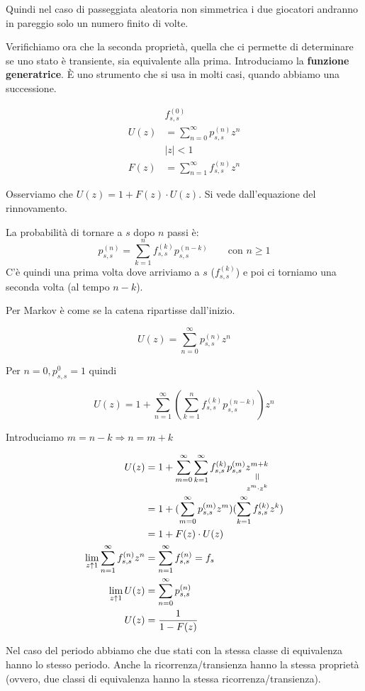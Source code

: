 \documentclass[a4paper,12pt]{book}
\newcommand{\verteq}{\rotatebox{90}{$\,=$}}
\newcommand{\equalto}[2]{\underset{\scriptstyle\overset{\mkern4mu\verteq}{#2}}{#1}}
\begin{document}
Quindi nel caso di passeggiata aleatoria non simmetrica i due giocatori andranno in pareggio solo un numero finito di volte. 

Verifichiamo ora che la seconda proprietà, quella che ci permette di determinare se uno stato è transiente, sia equivalente alla prima. Introduciamo la \textbf{funzione generatrice}. È uno strumento che si usa in molti casi, quando abbiamo una successione. 

\begin{align*}
	& f_{s,s}^{(0)} \\
	U(z) & = \sum_{n=0}^{\infty} p_{s,s}^{(n)} z^n \\
	& |z| < 1 \\
	F(z) & = \sum_{n=1}^{\infty} f_{s,s}^{(n)} z^n
\end{align*}

Osserviamo che $ U(z) = 1 + F(z)\cdot U(z) $. Si vede dall'equazione del rinnovamento. 

La probabilità di tornare a $ s $ dopo $ n $ passi è:
$$ p_{s,s}^{(n)} = \sum_{k=1}^{n} f_{s,s}^{(k)} p_{s,s}^{(n-k)} \qquad \text{con } n \ge 1 $$
C'è quindi una prima volta dove arriviamo a $ s $ ($ f_{s,s}^{(k)} $) e poi ci torniamo una seconda volta (al tempo $ n-k $). 

Per Markov è come se la catena ripartisse dall'inizio. 


 $$ U(z) = \sum_{n=0}^{\infty} p_{s,s}^{(n)} z^n $$
 
Per $ n = 0, p_{s,s}^0 = 1 $ quindi 

$$ U(z)	= 1 + \sum_{n=1}^{\infty} (\sum_{k=1}^{n} f_{s,s}^{(k)} p_{s,s}^{(n-k)}) z^n $$

Introduciamo $ m = n-k \Rightarrow n=m+k $

\begin{align*}
	U(z) & = 1 + \sum_{m=0}^{\infty} \sum_{k=1}^{\infty} f_{s,s}^{(k)} p_{s,s}^{(m)} \equalto{z^{m+k}}{z^m\cdot z^k} \\
	& = 1 + (\sum_{m=0}^{\infty}p_{s,s}^{(m)} z^m )(\sum_{k=1}^{\infty} f_{s,s}^{(k)}z^k ) \\
	& = 1 + F(z)\cdot U(z) \\
	\lim\limits_{z \uparrow 1} \sum_{n=1}^{\infty} f_{s,s}^{(n)} z^n & = \sum_{n=1}^{\infty} f_{s,s}^{(n)} = f_s \\
	\lim\limits_{z \uparrow 1} U(z) & = \sum_{n=0}^{\infty} p_{s,s}^{(n)} \\
	U(z) & = \frac{1}{1 - F(z)}
\end{align*}

Nel caso del periodo abbiamo che due stati con la stessa classe di equivalenza hanno lo stesso periodo. Anche la ricorrenza/transienza hanno la stessa proprietà (ovvero, due classi di equivalenza hanno la stessa ricorrenza/transienza). 
\end{document}
